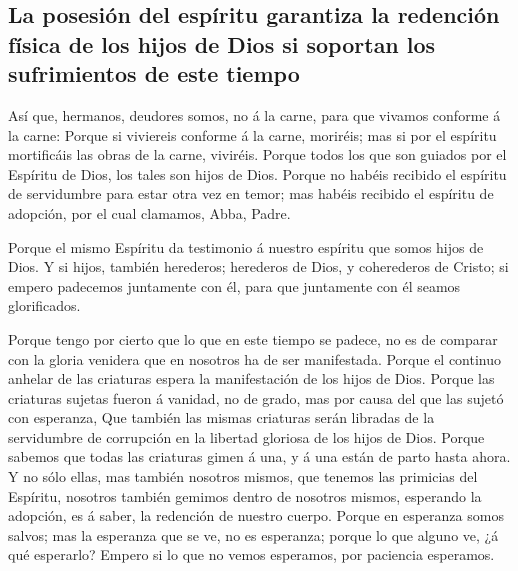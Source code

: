 \hypertarget{la-posesiuxf3n-del-espuxedritu-garantiza-la-redenciuxf3n-fuxedsica-de-los-hijos-de-dios-si-soportan-los-sufrimientos-de-este-tiempo}{%
\subsection{La posesión del espíritu garantiza la redención física de
los hijos de Dios si soportan los sufrimientos de este
tiempo}\label{la-posesiuxf3n-del-espuxedritu-garantiza-la-redenciuxf3n-fuxedsica-de-los-hijos-de-dios-si-soportan-los-sufrimientos-de-este-tiempo}}

 Así que, hermanos, deudores somos, no á la carne, para
que vivamos conforme á la carne:  Porque si viviereis
conforme á la carne, moriréis; mas si por el espíritu mortificáis las
obras de la carne, viviréis.  Porque todos los que son
guiados por el Espíritu de Dios, los tales son hijos de Dios.
 Porque no habéis recibido el espíritu de servidumbre
para estar otra vez en temor; mas habéis recibido el espíritu de
adopción, por el cual clamamos, Abba, Padre.

 Porque el mismo Espíritu da testimonio á nuestro
espíritu que somos hijos de Dios.  Y si hijos, también
herederos; herederos de Dios, y coherederos de Cristo; si empero
padecemos juntamente con él, para que juntamente con él seamos
glorificados.

 Porque tengo por cierto que lo que en este tiempo se
padece, no es de comparar con la gloria venidera que en nosotros ha de
ser manifestada.  Porque el continuo anhelar de las
criaturas espera la manifestación de los hijos de Dios. 
Porque las criaturas sujetas fueron á vanidad, no de grado, mas por
causa del que las sujetó con esperanza,  Que también las
mismas criaturas serán libradas de la servidumbre de corrupción en la
libertad gloriosa de los hijos de Dios.  Porque sabemos
que todas las criaturas gimen á una, y á una están de parto hasta ahora.
 Y no sólo ellas, mas también nosotros mismos, que
tenemos las primicias del Espíritu, nosotros también gemimos dentro de
nosotros mismos, esperando la adopción, es á saber, la redención de
nuestro cuerpo.  Porque en esperanza somos salvos; mas la
esperanza que se ve, no es esperanza; porque lo que alguno ve, ¿á qué
esperarlo?  Empero si lo que no vemos esperamos, por
paciencia esperamos.

